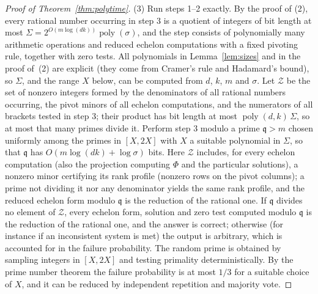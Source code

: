 \begin{proof}[Proof of Theorem~\ref{thm:polytime}]
(3) Run steps 1--2 exactly. By the proof of (2), every rational number occurring in step 3 is a
quotient of integers of bit length at most $\Sigma=2^{O(m\log(dk))}\operatorname{poly}(\sigma)$, and the step
consists of polynomially many arithmetic operations and reduced echelon computations with a fixed
pivoting rule, together with zero tests. All polynomials in Lemma~\ref{lem:sizes} and in the proof of~(2) are explicit (they come from Cramer's rule and Hadamard's bound), so $\Sigma$, and the range $X$ below, can be computed from $d$, $k$, $m$ and $\sigma$. Let $\mathcal Z$ be the set of nonzero integers formed by the
denominators of all rational numbers occurring, the pivot minors of all echelon computations, and the
numerators of all brackets tested in step 3; their product has bit length at most
$\operatorname{poly}(d,k)\,\Sigma$, so at most that many primes divide it. Perform step 3 modulo a prime $\mathfrak q>m$
chosen uniformly among the primes in $[X,2X]$ with $X$ a suitable polynomial in $\Sigma$, so that $\mathfrak q$ has
$O(m\log(dk)+\log\sigma)$ bits. Here $\mathcal Z$ includes, for every echelon computation (also the
projection computing $\Phi$ and the particular solutions), a nonzero minor certifying its rank profile
(nonzero rows on the pivot columns); a prime not dividing it nor any denominator yields the same rank
profile, and the reduced echelon form modulo $\mathfrak q$ is the reduction of the rational one. If
$\mathfrak q$ divides no element of $\mathcal Z$, every echelon form, solution and zero test computed
modulo $\mathfrak q$ is the reduction of the rational one, and the answer is correct; otherwise (for
instance if an inconsistent system is met) the output is arbitrary, which is accounted for in the failure
probability. The random prime is obtained by sampling integers in $[X,2X]$ and testing primality
deterministically. By the prime
number theorem the failure probability is at most $1/3$ for a suitable choice of $X$, and it can be
reduced by independent repetition and majority vote.
\end{proof}

